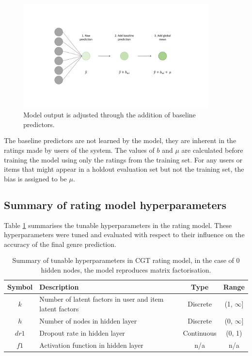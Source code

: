 \begin{figure}[H]
\centering
\includegraphics[width=0.9\textwidth]{Figures/4_CGT-output-layer.pdf}
\decoRule
\caption[Rating layer]{Model output is adjusted through the addition of baseline predictors.}
\label{fig:4_CGT-rating-layer}
\end{figure}

The baseline predictors are not learned by the model, they are inherent in the ratings made by users of the system. The values of $b$ and $\mu$ are calculated before training the model using only the ratings from the training set. For any users or items that might appear in a holdout evaluation set but not the training set, the bias is assigned to be $\mu$.

\subsection{Summary of rating model hyperparameters}
Table \ref{tab:rating-hparams} summarises the tunable hyperparameters in the rating model. These hyperparameters were tuned and evaluated with respect to their influence on the accuracy of the final genre prediction.
\begin{table}[H]
\centering
\begin{tabular}{c | p{3.5cm} | c | c}
\toprule
\textbf{Symbol} & \textbf{Description} & \textbf{Type} & \textbf{Range} \\
\midrule
$k$ & Number of latent factors in user and item latent factors & Discrete & (1, $\infty$] \\
\midrule
$h$ & Number of nodes in hidden layer & Discrete & (0, $\infty$] \\
\midrule
$dr1$ & Dropout rate in hidden layer & Continuous & (0, 1) \\
\midrule
$f1$ & Activation function in hidden layer & n/a & n/a \\
\bottomrule
\end{tabular}
\caption[Rating model hyperparameters]{Summary of tunable hyperparameters in CGT rating model, in the case of 0 hidden nodes, the model reproduces matrix factorisation.}
\label{tab:rating-hparams}
\end{table}

